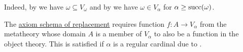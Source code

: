 \begin{remark}
\begin{thmenum}[series=thm:cumulative_hierarchy_model_of_zfc]
    Indeed, by  we have \( \omega \subseteq V_\omega \) and by  we have \( \omega \in V_\alpha \) for \( \alpha \geq \operatorname{succ}(\omega) \).

     The \hyperref[def:zfc/replacement]{axiom schema of replacement} requires function \( f: A \to V_\alpha \) from the metatheory whose domain \( A \) is a member of \( V_\alpha \) to also be a function in the object theory. This is satisfied if \( \alpha \) is a regular cardinal due to .
  \end{thmenum}
\end{remark}
